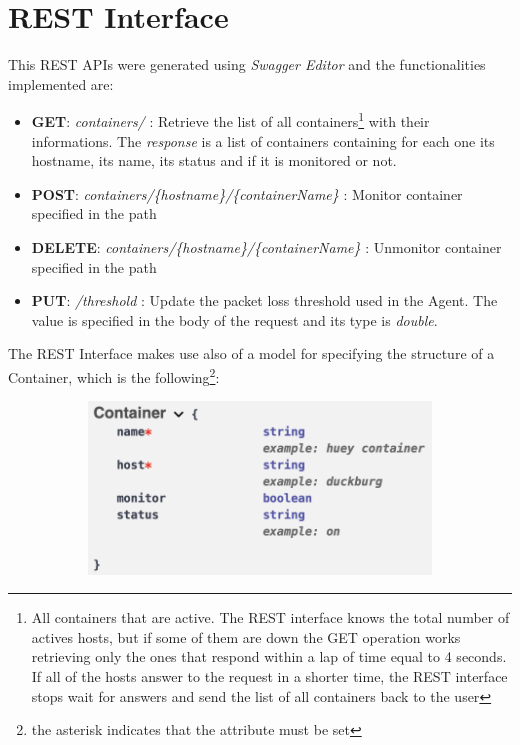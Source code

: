 \section{REST Interface}
This REST APIs were generated using \textit{Swagger Editor} and the functionalities implemented are:

\begin{itemize}
	\item \textbf{GET}:
		\subitem \textit{containers/} : Retrieve the list of all containers\footnote{All containers that are active. The REST interface knows the total number of actives hosts, but if some of them are down the GET operation works retrieving only the ones that respond within a lap of time equal to 4 seconds. If all of the hosts answer to the request in a shorter time, the REST interface stops wait for answers and send the list of all containers back to the user} with their informations. The \textit{response} is a list of containers containing for each one its hostname, its name, its status and if it is monitored or not.
	\item \textbf{POST}:
		\subitem \textit{containers/\{hostname\}/\{containerName\}} : Monitor container specified in the path
	\item \textbf{DELETE}:
		\subitem \textit{containers/\{hostname\}/\{containerName\}} : Unmonitor container specified in the path
	\item \textbf{PUT}:
		\subitem \textit{/threshold} : Update the packet loss threshold used in the Agent. The value is specified in the body of the request and its type is \textit{double}.
\end{itemize}

\noindent The REST Interface makes use also of a model for specifying the structure of a Container, which is the following\footnote{the asterisk indicates that the attribute must be set}:

\begin{figure}[H]
	\begin{subfigure}{\textwidth}
	\centering
		\includegraphics[width=0.9\linewidth]{img/container.png} 
	\end{subfigure}
\end{figure}